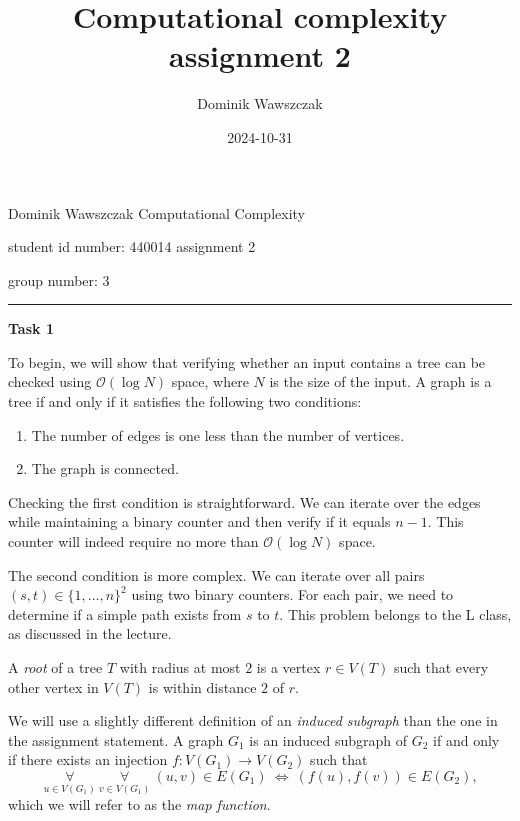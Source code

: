 \documentclass[12pt]{article}
\title{Computational complexity assignment 2}
\author{Dominik Wawszczak}
\date{2024-10-31}
\begin{document}
	\setlength{\parindent}{0 cm}
	
	Dominik Wawszczak \hfill Computational Complexity
	
	student id number: 440014 \hfill assignment 2
	
	group number: 3
	
	\bigskip
	\hrule
	\bigskip
	
	\textbf{Task 1}
	
	\medskip
	
	To begin, we will show that verifying whether an input contains a tree can
	be checked using \(\mathcal{O}(\log N)\) space, where \(N\) is the size of
	the input. A graph is a tree if and only if it satisfies the following two
	conditions:
	\begin{enumerate}
		\item The number of edges is one less than the number of vertices.
		\item The graph is connected.
	\end{enumerate}
	Checking the first condition is straightforward. We can iterate over the
	edges while maintaining a binary counter and then verify if it equals
	\(n - 1\). This counter will indeed require no more than
	\(\mathcal{O}(\log N)\) space.
	
	\medskip
	
	The second condition is more complex. We can iterate over all pairs \((s, t)
	\in \{1, \ldots, n\}^{2}\) using two binary counters. For each pair, we need
	to determine if a simple path exists from \(s\) to \(t\). This problem
	belongs to the L class, as discussed in the lecture.
	
	\medskip
	
	A \textit{root} of a tree \(T\) with radius at most \(2\) is a vertex \(r
	\in V(T)\) such that every other vertex in \(V(T)\) is within distance \(2\)
	of \(r\).
	
	\medskip
	
	We will use a slightly different definition of an \textit{induced subgraph}
	than the one in the assignment statement. A graph \(G_{1}\) is an induced
	subgraph of \(G_{2}\) if and only if there exists an injection \(f :
	V(G_{1}) \to V(G_{2})\) such that
	\[ \underset{u \in V(G_{1})}{\forall} \ \underset{v \in V(G_{1})}{\forall} \
	(u, v) \in E(G_{1}) \ \iff \ (f(u), f(v)) \in E(G_{2}) \text{,} \]
	which we will refer to as the \textit{map function}.
	
	\medskip
	
\end{document}
